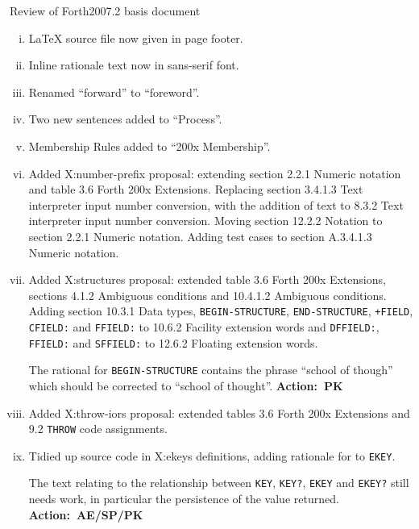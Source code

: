 \documentclass{article}
\makeatletter
\newcommand{\action}[1]{%
	\mbox{}\hfill \textbf{Action:~#1}%
}
\newcommand{\word}[1]{\texttt{#1}}
\renewcommand{\section}{\@startsection
	{section}{1}{0pt}{1pt}{1pt}
	{\normalfont\bfseries}
}
\makeatother
\begin{document}
\section{Review of Forth2007.2 basis document}
\label{review}
	\begin{enumerate}[i)]
	\item \LaTeX{} source file now given in page footer.

	\item Inline rationale text now in sans-serif font.

	\item Renamed ``forward'' to ``foreword''.

	\item Two new sentences added to ``Process''.

	\item Membership Rules added to ``200x Membership''.

	\item Added \textsf{X:number-prefix} proposal:
		extending section 2.2.1 Numeric notation and table 3.6 Forth 200x
		Extensions. Replacing section 3.4.1.3 Text interpreter input number
		conversion, with the addition of text to 8.3.2 Text interpreter input
		number conversion.  Moving section 12.2.2 Notation to section 2.2.1
		Numeric notation.  Adding test cases to section A.3.4.1.3 Numeric
		notation.

	\item Added \textsf{X:structures} proposal:
		extended table 3.6 Forth 200x Extensions, sections 4.1.2 Ambiguous
		conditions and 10.4.1.2 Ambiguous conditions.
		Adding section 10.3.1 Data types,
		\word{BEGIN-STRUCTURE}, \word{END-STRUCTURE}, \word{+FIELD},
		\word{CFIELD:} and \word{FFIELD:} to 10.6.2 Facility extension words
		and \word{DFFIELD:}, \word{FFIELD:} and \word{SFFIELD:} to 12.6.2
		Floating extension words.

		The rational for \word{BEGIN-STRUCTURE} contains the phrase
		``school of though'' which should be corrected to ``school of
		thought''.
		\action{PK}

	\item Added \textsf{X:throw-iors} proposal:
		extended tables 3.6 Forth 200x Extensions and 9.2 \word{THROW}
		code assignments.

	\item Tidied up source code in \textsf{X:ekeys} definitions, adding
		rationale for to \word{EKEY}.

		The text relating to the relationship between \word{KEY}, \word{KEY?},
		\word{EKEY} and \word{EKEY?} still needs work, in particular the
		persistence of the value returned.
		\action{AE/SP/PK}


\end{enumerate}
\end{document}
